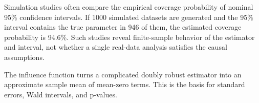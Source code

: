 Simulation studies often compare the empirical coverage probability of nominal 95\%
confidence intervals. If 1000 simulated datasets are generated and the 95\% interval
contains the true parameter in 946 of them, the estimated coverage probability is
94.6\%. Such studies reveal finite-sample behavior of the estimator and interval, not
whether a single real-data analysis satisfies the causal assumptions.

\begin{keyidea}
The influence function turns a complicated doubly robust estimator into an approximate
sample mean of mean-zero terms. This is the basis for standard errors, Wald intervals,
and p-values.
\end{keyidea}
